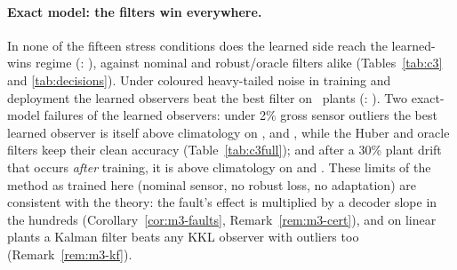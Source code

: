 \paragraph{Exact model: the filters win everywhere.} In none of the fifteen stress conditions does the learned side reach the learned-wins regime (: \CthreeFaultsRegimes), against nominal and robust/oracle filters alike (Tables~\ref{tab:c3} and \ref{tab:decisions}). Under coloured heavy-tailed noise in training and deployment the learned observers beat the best filter on \CthreeNoiseCtSeqVsWorking\ plants (: \OutcomeCThreeNoiseCt). Two exact-model failures of the learned observers: under 2\% gross sensor outliers the best learned observer is itself above climatology on ,  and , while the Huber and oracle filters keep their clean accuracy (Table~\ref{tab:c3full}); and after a 30\% plant drift that occurs \emph{after} training, it is above climatology on  and . These limits of the method as trained here (nominal sensor, no robust loss, no adaptation) are consistent with the theory: the fault's effect is multiplied by a decoder slope in the hundreds (Corollary~\ref{cor:m3-faults}, Remark~\ref{rem:m3-cert}), and on linear plants a Kalman filter beats any KKL observer with outliers too (Remark~\ref{rem:m3-kf}).



